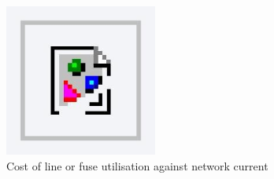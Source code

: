 \begin{figure}
	\includegraphics[width=5cm]{foo}
	\caption{Cost of line or fuse utilisation against network current}
	\label{ch1:fig:fuse-utilisation}
\end{figure}